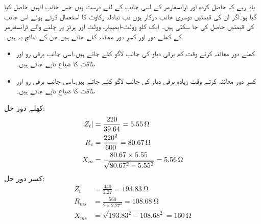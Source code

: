 یاد رہے کہ حاصل کردہ  اور  ٹرانسفارمر کے اسی جانب کے لئے درست ہیں جس جانب انہیں حاصل کیا گیا ہو۔اگر ان کی قیمتیں دوسری جانب درکار ہوں تب تبادلہ رکاوٹ کا استعمال کرتے ہوئے اس جانب کی قیمتیں حاصل کی جا سکتی ہیں۔ 
%
ایک   کلو وولٹ-ایمپیئر،  وولٹ اور  ہرٹز پر چلنے والے ٹرانسفارمر کے کھلے دور اور کسرِ دور معائنہ کئے جاتے ہیں جن کے نتائج یہ ہیں۔
\begin{itemize}
\item
کھلے دور معائنہ کرتے وقت کم برقی دباو کی جانب   لاگو کئے جاتے ہیں۔اسی جانب برقی رو  اور طاقت کا ضیاع  ناپے جاتے ہیں۔
\item
کسرِ دور معائنہ کرتے وقت زیادہ برقی دباو کی جانب   لاگو کئے جاتے ہیں۔اسی جانب برقی رو  اور طاقت کا ضیاع  ناپے جاتے ہیں۔
\end{itemize}

کھلے دور حل:
\begin{align*}
\abs{Z_t}&=\frac{220}{39.64}=\SI{5.55}{\ohm}\\
R_c&=\frac{220^2}{600}=\SI{80.67}{\ohm}\\
X_m&=\frac{80.67 \times 5.55}{\sqrt{80.67^2-5.55^2}}=\SI{5.56}{\ohm}
\end{align*}
کسر دور حل:
\begin{align*}
Z_t&=\frac{440}{2.27}=\SI{193.83}{\ohm}\\
R_{ms}&=\frac{560}{2 \times 2.27^2}=\SI{108.68}{\ohm}\\
X_{ms}&=\sqrt{193.83^2-108.68^2}=\SI{160}{\ohm}
\end{align*}

